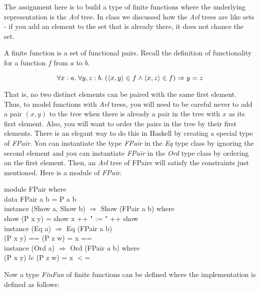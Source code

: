\documentclass[11pt]{article}
\begin{document}
The assignment here is to build
a type of finite functions where the underlying representation is the {\it{Avl}} tree.
In class we discussed how the {\it{Avl}} trees are like sets - if you add an element to the set
that is already there, it does not chance the set.
 
A finite function is a set of functional pairs.  Recall the definition of
functionality for a function $f$ from $a$ to $b$.

\[
\forall{}x:a.\;\forall{}y,z:b.\; ({\langle{x,y}\rangle}\in{}f \wedge {\langle{x,z}\rangle}\in{}f)
\Rightarrow y = z\] 

That is, no two distinct elements can be paired with the same first
element. Thus, to model functions with {\it{Avl}} trees, you will need to be careful
never to add a pair $(x,y)$ to the tree when there is already a pair in the
tree with $x$ as its first element.  Also, you will want to order the pairs in
the tree by their first elements.  There is an elegant way to do this in
Haskell by creating a special type of {\it{FPair}}. You can instantiate the
type {\it{FPair}} in the {\it{Eq}} type class by ignoring the second element
and you can instantiate {\it{FPair}} in the {\it{Ord}} type class by ordering
on the first element.  Then, an {\it{Avl}} tree of FPairs will satisfy the constraints
just mentioned.  Here is a module of {\it{FPair}}.

\begin{smallprogram*}
\>   module FPair where \vspace{1em}\\
\>   data FPair a b = P a b   \vspace{1em}\\
\>   instance (Show a, Show b) $\Rightarrow$ Show (FPair a b) where\\
\>      show (P x y) = show x ++ " := " ++ show \vspace{1em}\\
\>   instance (Eq a) $\Rightarrow$ Eq (FPair a b) \\
\>      (P x y) == (P z w) = x == \vspace{1em}\\
\>   instance (Ord a) $\Rightarrow$ Ord (FPair a b) where\\
\>     (P x y) $le$ (P z w) = x $<$= \\
\end{smallprogram*}

Now a type {\it{FinFun}} of finite functions can be defined where the
implementation is defined as follows:
\end{document}
